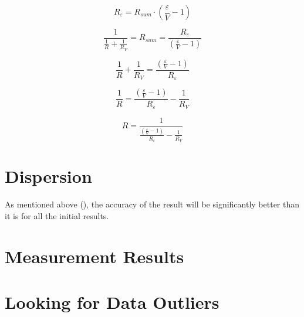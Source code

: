 \documentclass[11pt]{memoir}
\begin{document}
    \begin{equation*}
        R_\varepsilon = R_{sum} \cdot \left(\frac{\varepsilon}{V} - 1 \right)
    \end{equation*}

    \begin{equation*}
        \frac{1}{\frac{1}{R} + \frac{1}{R_V}} = R_{sum} = \frac{R_\varepsilon}{\left(\frac{\varepsilon}{V} - 1 \right)}
    \end{equation*}

    \begin{equation*}
        \frac{1}{R} + \frac{1}{R_V} = \frac{\left(\frac{\varepsilon}{V} - 1 \right)}{R_\varepsilon}
    \end{equation*}

    \begin{equation*}
        \frac{1}{R} = \frac{\left(\frac{\varepsilon}{V} - 1 \right)}{R_\varepsilon} -  \frac{1}{R_V}
    \end{equation*}


    \begin{equation}\label{eq:equation3}
        R = \frac{1}{\frac{\left(\frac{\varepsilon}{V} - 1 \right)}{R_\varepsilon} -  \frac{1}{R_V}}
    \end{equation}


%
%

    \section {Dispersion}\label{sec:dispersion}
        \newline
        As mentioned above (), the accuracy of the result will be significantly better than it is for all the initial results.

    \section{Measurement Results}\label{sec:measurement-results}

    \section {Looking for Data Outliers}\label{sec:looking-for-data-outliers}
\end{document}

